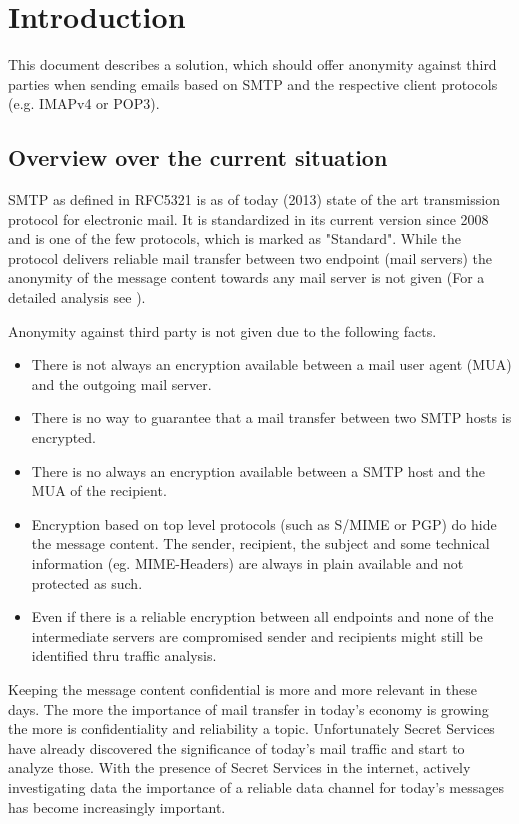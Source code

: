 \documentclass[11pt,a4paper]{book}
\begin{document}
\tableofcontents
\listoftables
\listoffigures

\mainmatter
\chapter{Introduction}
This document describes a solution, which should offer anonymity against third parties when sending emails based on SMTP and the respective client protocols (e.g. IMAPv4 or POP3).

\section{Overview over the current situation}
SMTP as defined in RFC5321\cite{RFC5321} is as of today (2013)  state of the art transmission protocol for electronic mail. It is standardized in its current version since 2008 and is one of the few protocols, which is marked as "Standard". While the protocol delivers reliable mail transfer between two endpoint (mail servers) the anonymity of the message content towards any mail server is not given (For a detailed analysis see ).\par

Anonymity against third party is not given due to the following facts.

\begin{itemize}
  \item There is not always an encryption available between a mail user agent (MUA) and the outgoing mail server.
	\item There is no way to guarantee that a mail transfer between two SMTP hosts is encrypted.
	\item There is no always an encryption available between a SMTP host and the MUA of the recipient.
  \item Encryption based on top level protocols (such as S/MIME or PGP) do hide the message content. The sender, recipient, the subject and some technical information (eg. MIME-Headers) are always in plain available and not protected as such.
	\item Even if there is a reliable encryption between all endpoints and none of the intermediate servers are compromised sender and recipients might still be identified thru traffic analysis.
\end{itemize}

Keeping the message content confidential is more and more relevant in these days. The more the importance of mail transfer in today's economy is growing the more is confidentiality and reliability a topic. Unfortunately Secret Services have already discovered the significance of today's mail traffic and start to analyze those. With the presence of Secret Services in the internet, actively investigating data the importance of a reliable data channel for today's messages has become increasingly important. 
\end{document}
